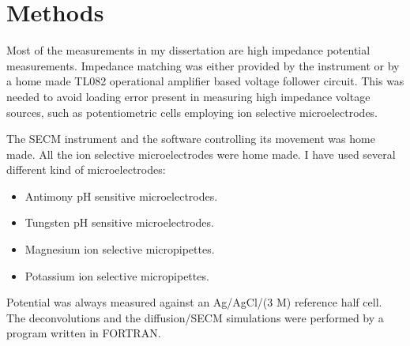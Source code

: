 \section{Methods}
Most of the measurements in my dissertation are high impedance potential measurements. Impedance matching was either provided by the instrument or by a home made TL082 operational amplifier based voltage follower circuit. This was needed to avoid loading error present in measuring high impedance voltage sources, such as potentiometric cells employing ion selective microelectrodes.

The SECM instrument and the software controlling its movement was home made. All the ion selective microelectrodes were home made. I have used several different kind of microelectrodes:

\begin{itemize}
\item Antimony pH sensitive microelectrodes.
\item Tungsten pH sensitive microelectrodes.
\item Magnesium ion selective micropipettes.
\item Potassium ion selective micropipettes.
\end{itemize}

Potential was always measured against an Ag/AgCl/(3 M) reference half cell. The deconvolutions and the diffusion/SECM simulations were performed by a program written in FORTRAN.
